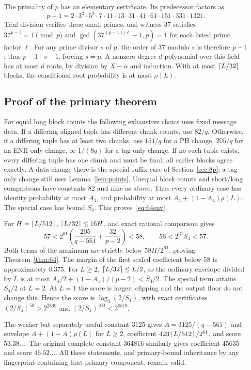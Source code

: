 The primality of $p$ has an elementary certificate. Its predecessor factors as
\[
 p-1=2\cdot3^2\cdot5^2\cdot7\cdot11\cdot13\cdot31\cdot41\cdot61\cdot151\cdot331\cdot1321.
\]
Trial division verifies these small primes, and witness 37 satisfies $37^{p-1}=1\pmod p$ and $\gcd(37^{(p-1)/\ell}-1,p)=1$ for each listed prime factor $\ell$. For any prime divisor $s$ of $p$, the order of 37 modulo $s$ is therefore $p-1$; thus $p-1\mid s-1$, forcing $s=p$. A nonzero degree-$d$ polynomial over this field has at most $d$ roots, by division by $X-\alpha$ and induction. With at most $\left\lceil L/32\right\rceil$ blocks, the conditional root probability is at most $\rho(L)$.

\subsection{Proof of the primary theorem}
For equal long block counts the following exhaustive choice uses fixed message data. If a differing aligned tuple has different chunk counts, use $82/q$. Otherwise, if a differing tuple has at least two chunks, use $151/q$ for a PH change, $205/q$ for an ENH-only change, or $1/(8q)$ for a tag-only change. If no such tuple exists, every differing tuple has one chunk and must be final; all earlier blocks agree exactly. A data change there is the special suffix case of Section~\ref{sec:8p}; a tag-only change still uses Lemma~\ref{lem:points}. Unequal block counts and short/long comparisons have constants 82 and nine as above. Thus every ordinary case has identity probability at most $A_4$, and probability at most $A_4+(1-A_4)\rho(L)$. The special case has bound $S_4$. This proves~\eqref{eq:64env}.

For $H=\left\lceil L/512\right\rceil$, $\left\lceil L/32\right\rceil\le16H$, and exact rational comparison gives
\[
 57<2^{61}\left(\frac{205}{q-561}+\frac{32}{p-2}\right)<58,
 \qquad56<2^{61}S_4<57.
\]
Both terms of the maximum are strictly below $58H/2^{61}$, proving Theorem~\ref{thm:64}. The margin of the first scaled coefficient below 58 is approximately 0.375. For $L\ge2$, $\left\lceil L/32\right\rceil\le L/2$, so the ordinary envelope divided by $L$ is at most $A_4/2+(1-A_4)/(p-2)<S_4/2$. The special term attains $S_4/2$ at $L=2$. At $L=1$ the score is larger; clipping and the output floor do not change this. Hence the score is $\log_2(2/S_4)$, with exact certificates $(2/S_4)^{50}>2^{2809}$ and $(2/S_4)^{100}<2^{5619}$.

The weaker but separately useful constant 3125 gives $A=3125/(q-561)$ and envelope $A+(1-A)\rho(L)$ for $L\ge2$, coefficient $423\left\lceil L/512\right\rceil/2^{61}$, and score $53.38\ldots$. The original complete constant 364816 similarly gives coefficient 45635 and score $46.52\ldots$. All these statements, and primary-bound inheritance by any fingerprint containing that primary component, remain valid.

